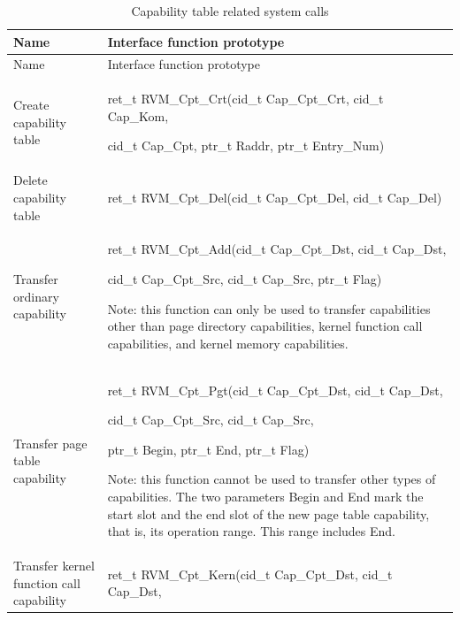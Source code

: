 \begin{xltabular}{\textwidth}{@{}>{\hsize\raggedright\arraybackslash}X>{\hsize\raggedright\arraybackslash}X@{}}
\caption{Capability table related system calls}\label{tab:3-5}\\
\toprule
Name & Interface function prototype\tabularnewline
\endfirsthead
\toprule
Name & Interface function prototype\tabularnewline
\midrule
\endhead
\bottomrule
\endlastfoot
Create capability table\strut
 & ret\_\allowbreak{}t RVM\_\allowbreak{}Cpt\_\allowbreak{}Crt(cid\_\allowbreak{}t Cap\_\allowbreak{}Cpt\_\allowbreak{}Crt, cid\_\allowbreak{}t Cap\_\allowbreak{}Kom,

cid\_\allowbreak{}t Cap\_\allowbreak{}Cpt, ptr\_\allowbreak{}t Raddr, ptr\_\allowbreak{}t Entry\_\allowbreak{}Num)\strut
\tabularnewline
Delete capability table & ret\_\allowbreak{}t RVM\_\allowbreak{}Cpt\_\allowbreak{}Del(cid\_\allowbreak{}t Cap\_\allowbreak{}Cpt\_\allowbreak{}Del, cid\_\allowbreak{}t
Cap\_\allowbreak{}Del)\tabularnewline
Transfer ordinary capability\strut
 & ret\_\allowbreak{}t RVM\_\allowbreak{}Cpt\_\allowbreak{}Add(cid\_\allowbreak{}t Cap\_\allowbreak{}Cpt\_\allowbreak{}Dst, cid\_\allowbreak{}t Cap\_\allowbreak{}Dst,

cid\_\allowbreak{}t Cap\_\allowbreak{}Cpt\_\allowbreak{}Src, cid\_\allowbreak{}t Cap\_\allowbreak{}Src, ptr\_\allowbreak{}t Flag)

Note: this function can only be used to transfer capabilities other than page directory capabilities, kernel function call capabilities, and kernel memory capabilities.\strut
\tabularnewline
Transfer page table capability\strut
 & ret\_\allowbreak{}t RVM\_\allowbreak{}Cpt\_\allowbreak{}Pgt(cid\_\allowbreak{}t Cap\_\allowbreak{}Cpt\_\allowbreak{}Dst, cid\_\allowbreak{}t Cap\_\allowbreak{}Dst,

cid\_\allowbreak{}t Cap\_\allowbreak{}Cpt\_\allowbreak{}Src, cid\_\allowbreak{}t Cap\_\allowbreak{}Src,

ptr\_\allowbreak{}t Begin, ptr\_\allowbreak{}t End, ptr\_\allowbreak{}t Flag)

Note: this function cannot be used to transfer other types of capabilities. The two parameters Begin and End mark the start slot and the end slot of the new page table capability, that is, its operation range. This range includes End.\strut
\tabularnewline
Transfer kernel function call capability\strut
 & ret\_\allowbreak{}t RVM\_\allowbreak{}Cpt\_\allowbreak{}Kern(cid\_\allowbreak{}t Cap\_\allowbreak{}Cpt\_\allowbreak{}Dst, cid\_\allowbreak{}t Cap\_\allowbreak{}Dst,


\end{xltabular}
